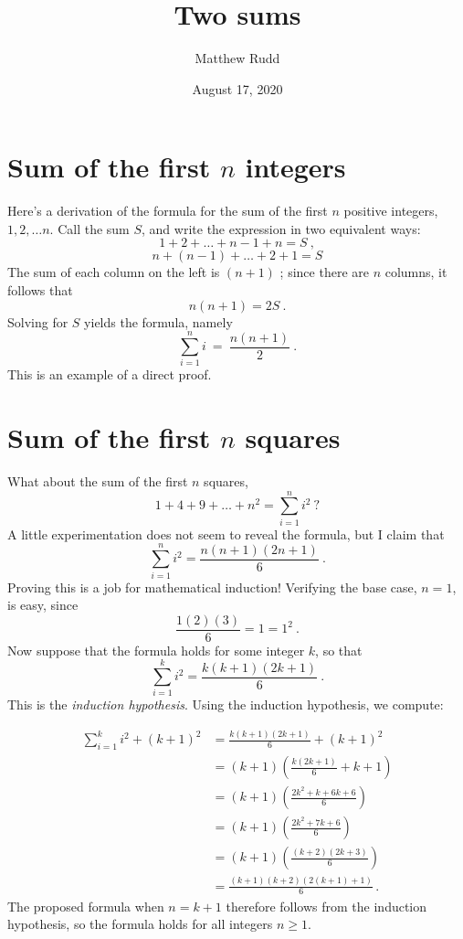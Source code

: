 \documentclass{article}
\title{Two sums}
\author{Matthew Rudd}
\date{August 17, 2020}
\begin{document}
\maketitle

\section{Sum of the first $n$ integers}

Here's a derivation of the formula for the sum of the first $n$ positive integers, $1, 2, \ldots n$.
Call the sum $S$, and write the expression in two equivalent ways:
$$ 1 + 2 + \ldots + n-1 + n = S \ , $$
$$ n + (n-1) + \ldots + 2 + 1 = S $$
The sum of each column on the left is $(n+1)$ ; since there are $n$ columns, it follows that
$$ n (n+1) = 2S \ . $$
Solving for $S$ yields the formula, namely
$$ \sum_{ i=1 }^{n}{ i } \ = \ \frac{ n(n+1) }{ 2 } \  . $$
This is an example of a direct proof.

\section{Sum of the first $n$ squares}

What about the sum of the first $n$ squares,
$$ 1 + 4 + 9 + \ldots + n^2 = \sum_{i=1}^{n}{ i^2 } \ ? $$
A little experimentation does not seem to reveal the formula, but I claim that
$$ \sum_{i=1}^{n}{ i^2 } = \frac{ n(n+1)(2n+1) }{ 6 } \ .$$
Proving this is a job for mathematical induction! Verifying the base case, $n=1$, is easy, since
$$ \frac{1(2)(3) }{6} = 1 = 1^2 \ . $$
Now suppose that the formula holds for some integer $k$, so that
$$ \sum_{i=1}^{k}{ i^2 } = \frac{ k(k+1)(2k+1) }{ 6 } \ .$$ 
This is the \textit{induction hypothesis}. Using the induction hypothesis, we compute:

\begin{align*}
\sum_{i=1}^{k}{ i^2 } + (k+1)^2 & = \frac{ k(k+1)(2k+1) }{ 6 } + (k+1)^2 \\
& = (k+1) \left( \frac{k(2k+1)}{6} + k+1 \right) \\
& = (k+1) \left( \frac{ 2 k^2 + k + 6k + 6 }{6} \right) \\
& = (k+1) \left( \frac{ 2k^2 + 7k + 6 }{ 6 } \right) \\
& = (k+1) \left( \frac{ (k+2)(2k+3) }{ 6 } \right) \\
& = \frac{ (k+1)(k+2)( 2(k+1) + 1 )}{6} \, .
\end{align*}
The proposed formula when $n=k+1$ therefore follows from the induction hypothesis, so the formula 
holds for all integers $n \geq 1$.
\end{document}
